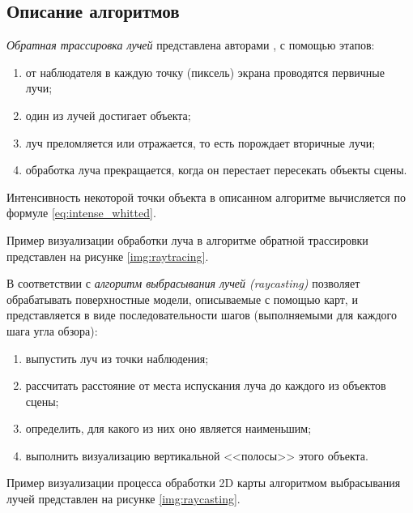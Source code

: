 \subsection{Описание алгоритмов}

\textit{Обратная трассировка лучей} представлена авторами \cite{порев2002компьютерная}, \cite{демин2011} с помощью этапов:
\begin{enumerate}
	\item от наблюдателя в каждую точку (пиксель) экрана проводятся первичные лучи;
	\item один из лучей достигает объекта;
	\item луч преломляется или отражается, то есть порождает вторичные лучи;
	\item обработка луча прекращается, когда он перестает пересекать объекты сцены.
\end{enumerate}

Интенсивность некоторой точки объекта в описанном алгоритме вычисляется по формуле \ref{eq:intense_whitted}.

Пример визуализации обработки луча в алгоритме обратной трассировки представлен на рисунке \ref{img:raytracing}.


В соответствии с \cite{евстратов2020создание} \textit{алгоритм выбрасывания лучей (raycasting)} позволяет обрабатывать поверхностные модели, описываемые с помощью карт, и представляется в виде последовательности шагов (выполняемыми для каждого шага угла обзора):
\begin{enumerate}
	\item выпустить луч из точки наблюдения;
	\item рассчитать расстояние от места испускания луча до каждого из объектов сцены;
	\item определить, для какого из них оно является наименьшим;
	\item выполнить визуализацию вертикальной <<полосы>> этого объекта.
\end{enumerate}

Пример визуализации процесса обработки 2D карты алгоритмом выбрасывания лучей представлен на рисунке \ref{img:raycasting}.


